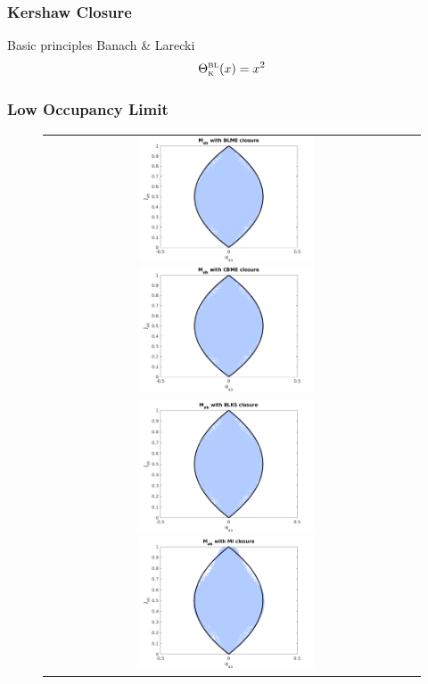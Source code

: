 \subsubsection{Kershaw Closure}
Basic principles
Banach \& Larecki \cite{banachLarecki_2017}
\begin{equation}
  \Theta_{\mbox{\tiny K}}^{\mbox{\tiny BL}}(x)=x^{2}
\end{equation}

\subsubsection{Low Occupancy Limit}

\begin{figure}
  \centering
  \begin{tabular}{cc}
    \includegraphics[width=0.5\textwidth]{figures/MabWithBLME}
    \includegraphics[width=0.5\textwidth]{figures/MabWithCBME} \\
    \includegraphics[width=0.5\textwidth]{figures/MabWithBLKS}
    \includegraphics[width=0.5\textwidth]{figures/MabWithMI}
  \end{tabular}
  \caption{}
  \label{fig:MabWithDifferentClosure}
\end{figure}

